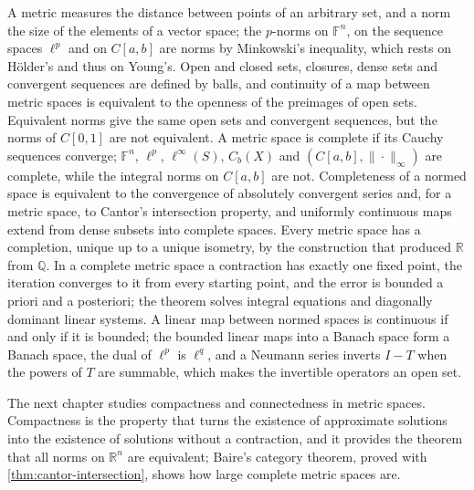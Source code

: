 \bigskip
A metric measures the distance between points of an arbitrary set, and a norm the size of the elements of a vector space; the $p$-norms on $\mathbb F^n$, on the sequence spaces $\ell^p$ and on $C[a,b]$ are norms by Minkowski's inequality, which rests on H\"older's and thus on Young's. Open and closed sets, closures, dense sets and convergent sequences are defined by balls, and continuity of a map between metric spaces is equivalent to the openness of the preimages of open sets. Equivalent norms give the same open sets and convergent sequences, but the norms of $C[0,1]$ are not equivalent. A metric space is complete if its Cauchy sequences converge; $\mathbb F^n$, $\ell^p$, $\ell^\infty(S)$, $C_b(X)$ and $(C[a,b],\|\cdot\|_\infty)$ are complete, while the integral norms on $C[a,b]$ are not. Completeness of a normed space is equivalent to the convergence of absolutely convergent series and, for a metric space, to Cantor's intersection property, and uniformly continuous maps extend from dense subsets into complete spaces. Every metric space has a completion, unique up to a unique isometry, by the construction that produced $\mathbb R$ from $\mathbb Q$. In a complete metric space a contraction has exactly one fixed point, the iteration converges to it from every starting point, and the error is bounded a priori and a posteriori; the theorem solves integral equations and diagonally dominant linear systems. A linear map between normed spaces is continuous if and only if it is bounded; the bounded linear maps into a Banach space form a Banach space, the dual of $\ell^p$ is $\ell^q$, and a Neumann series inverts $I-T$ when the powers of $T$ are summable, which makes the invertible operators an open set.

The next chapter studies compactness and connectedness in metric spaces. Compactness is the property that turns the existence of approximate solutions into the existence of solutions without a contraction, and it provides the theorem that all norms on $\mathbb R^n$ are equivalent; Baire's category theorem, proved with \cref{thm:cantor-intersection}, shows how large complete metric spaces are.

\chapternotes

